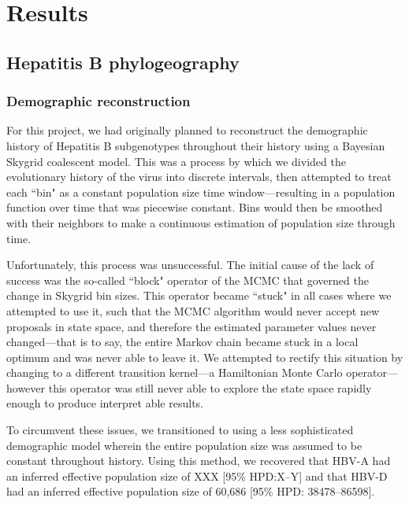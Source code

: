 \chapter{Results}\label{ch:results}

\section{Hepatitis B phylogeography}

\subsection{Demographic reconstruction}

For this project, we had originally planned to reconstruct the demographic history of Hepatitis B subgenotypes throughout their history using a Bayesian Skygrid coalescent model.
This was a process by which we divided the evolutionary history of the virus into discrete intervals, then attempted to treat each ``bin" as a constant population size time window---resulting in a population function over time that was piecewise constant.
Bins would then be smoothed with their neighbors to make a continuous estimation of population size through time.


Unfortunately, this process was unsuccessful.
The initial cause of the lack of success was the so-called ``block" operator of the MCMC that governed the change in Skygrid bin sizes.
This operator became ``stuck" in all cases where we attempted to use it, such that the MCMC algorithm would never accept new proposals in state space, and therefore the estimated parameter values never changed---that is to say, the entire Markov chain became stuck in a local optimum and was never able to leave it.
We attempted to rectify this situation by changing to a different transition kernel---a Hamiltonian Monte Carlo operator---however this operator was still never able to explore the state space rapidly enough to produce interpret able results.

To circumvent these issues, we transitioned to using a less sophisticated demographic model wherein the entire population size was assumed to be constant throughout history.
Using this method, we recovered that HBV-A had an inferred effective population size of XXX [95\% HPD:X--Y] and that HBV-D had an inferred effective population size of 60,686 [95\% HPD: 38478--86598].

